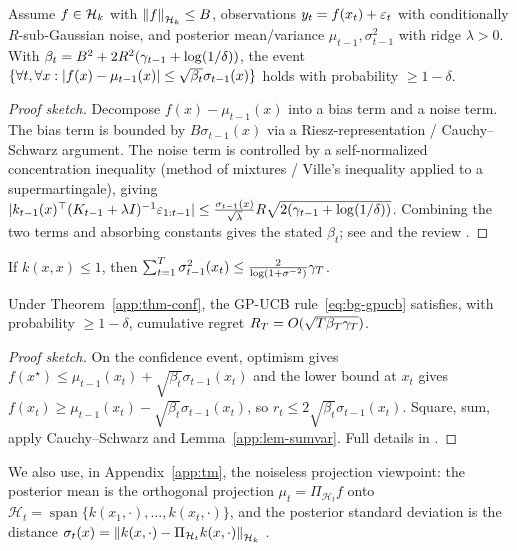 \begin{theorem}
\label{app:thm-conf}
Assume $f\in\mathcal{H}_k$ with $\left\lVert f\right\rVert_{\mathcal{H}_k}\le B$, observations $y_t=f(x_t)+\varepsilon_t$ with
conditionally $R$-sub-Gaussian noise, and posterior mean/variance
$\mu_{t-1},\sigma^2_{t-1}$ with ridge $\lambda>0$. With
$\beta_t=B^2+2R^2(\gamma_{t-1}+\log(1/\delta))$, the event
$\{\forall t,\forall x:\left\lvert f(x)-\mu_{t-1}(x)\right\rvert\le\sqrt{\beta_t}\sigma_{t-1}(x)\}$
holds with probability $\ge1-\delta$.
\end{theorem}

\begin{proof}[Proof sketch]
Decompose $f(x)-\mu_{t-1}(x)$ into a bias term and a noise term. The bias term is
bounded by $B\sigma_{t-1}(x)$ via a Riesz-representation / Cauchy--Schwarz
argument. The noise term is controlled by a self-normalized concentration
inequality (method of mixtures / Ville's inequality applied to a supermartingale),
giving $|k_{t-1}(x)^\top(K_{t-1}+\lambda I)^{-1}\varepsilon_{1:t-1}|\le
\frac{\sigma_{t-1}(x)}{\sqrt\lambda}R\sqrt{2(\gamma_{t-1}+\log(1/\delta))}$.
Combining the two terms and absorbing constants gives the stated $\beta_t$; see
\cite{srinivas2010} and the review \cite{kanagawa2018}.
\end{proof}

\begin{lemma}
\label{app:lem-sumvar}
If $k(x,x)\le1$, then
$\sum_{t=1}^T\sigma_{t-1}^2(x_t)\le\frac{2}{\log(1+\sigma^{-2})}\gamma_T$.
\end{lemma}

\begin{theorem}
\label{app:thm-gpucb}
Under Theorem~\ref{app:thm-conf}, the GP-UCB rule~\eqref{eq:bg-gpucb} satisfies,
with probability $\ge1-\delta$, cumulative regret $R_T=O(\sqrt{T\beta_T\gamma_T})$.
\end{theorem}

\begin{proof}[Proof sketch]
On the confidence event, optimism gives $f(x^\star)\le\mu_{t-1}(x_t)+
\sqrt{\beta_t}\sigma_{t-1}(x_t)$ and the lower bound at $x_t$ gives
$f(x_t)\ge\mu_{t-1}(x_t)-\sqrt{\beta_t}\sigma_{t-1}(x_t)$, so
$r_t\le2\sqrt{\beta_t}\sigma_{t-1}(x_t)$. Square, sum, apply Cauchy--Schwarz and
Lemma~\ref{app:lem-sumvar}. Full details in \cite{srinivas2010}.
\end{proof}

We also use, in Appendix~\ref{app:tm}, the noiseless projection viewpoint: the
posterior mean is the orthogonal projection $\mu_t=\Pi_{\mathcal H_t}f$ onto
$\mathcal H_t=\operatorname{span}\{k(x_1,\cdot),\dots,k(x_t,\cdot)\}$, and the
posterior standard deviation is the distance
$\sigma_t(x)=\left\lVert k(x,\cdot)-\Pi_{\mathcal H_t}k(x,\cdot)\right\rVert_{\mathcal{H}_k}$
\cite{kanagawa2018}.
